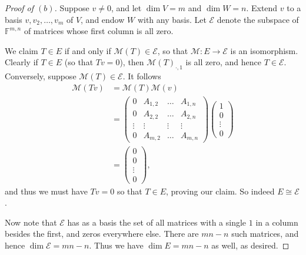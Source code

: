 \documentclass[11pt]{extarticle}
\newcommand{\F}{\mathbb{F}}
\newcommand{\mat}{\mathcal{M}}
\begin{document}
\begin{proof}[Proof of $(b)$]
Suppose $v\neq 0$, and let $\dim V = m$ and $\dim W = n$.   Extend $v$ to a basis $v, v_2, \dots, v_m$ of $V$, and endow $W$ with any basis.  Let $\mathcal{E}$ denote the subspace of $\F^{m,n}$ of matrices whose first column is all zero.  
\par We claim $T\in E$ if and only if $\mat(T)\in \mathcal{E}$, so that $\mat: E\to \mathcal{E}$ is an isomorphism.  Clearly if $T\in E$ (so that $Tv = 0$), then $\mat(T)_{\cdot, 1}$ is all zero, and hence $T\in\mathcal{E}$.  Conversely, suppose $\mat(T)\in \mathcal{E}$.  It follows
\begin{align*}
\mat(Tv) &= \mat(T)\mat(v)\\ 
&= \begin{pmatrix}
0 &A_{1, 2} &\dots &A_{1,n}\\ 
0 &A_{2,2} &\dots &A_{2,n}\\
\vdots &\vdots &\vdots &\vdots\\
0 &A_{m,2} &\dots &A_{m,n}
\end{pmatrix}
\begin{pmatrix}1\\ 0\\ \vdots\\ 0\end{pmatrix}\\
&= \begin{pmatrix}0\\ 0\\ \vdots\\ 0\end{pmatrix},
\end{align*}
and thus we must have $Tv = 0$ so that $T\in E$, proving our claim.  So indeed $E\cong \mathcal{E}$.  
\par Now note that $\mathcal{E}$ has as a basis the set of all matrices with a single $1$ in a column besides the first, and zeros everywhere else.  There are $mn - n$ such matrices, and hence $\dim \mathcal{E} = mn - n$.  Thus we have $\dim E = mn - n$ as well, as desired.  
\end{proof}
\end{document}
